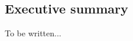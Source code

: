 \setcounter{page}{1} 

\begin{singlespace}
\chapter*{Executive summary}

To be written...

\end{singlespace}
\newpage